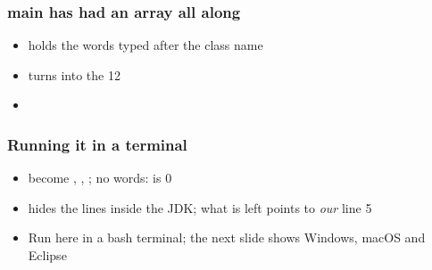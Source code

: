 \documentclass[aspectratio=169,10pt,compress]{beamer}
\begin{document}
\begin{frame}[t,fragile] \frametitle{main has had an array all along}

	\begin{itemize}\small
		\item {} holds the words typed after the class name
		\item {} turns  into the  12
		\item {}
	\end{itemize}
\end{frame}




\begin{frame}[t,fragile] \frametitle{Running it in a terminal}

	\begin{itemize}\small
		\item {} become , , ; no words:  is 0
		\item {} hides the lines inside the JDK; what is left points to \emph{our} line 5
		\item Run here in a bash terminal; the next slide shows Windows, macOS and Eclipse
	\end{itemize}
\end{frame}
\end{document}
